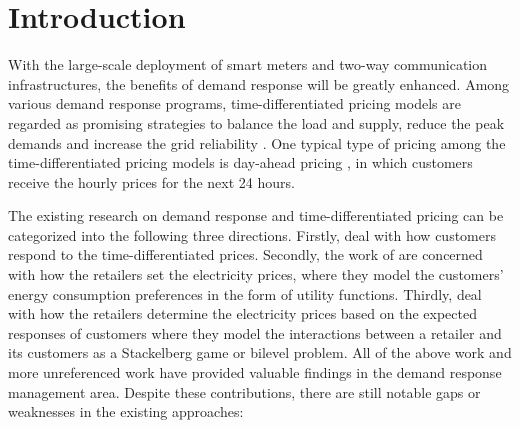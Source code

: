 \documentclass[10pt,journal]{IEEEtran}
\theoremstyle{definition}
\theoremstyle{plain} \newtheorem{theo}{Theorem} \newtheorem{prop}{Proposition}  \newtheorem{lemm}{Lemma}
\begin{document}
\IEEEpeerreviewmaketitle




\section{Introduction}



With the large-scale deployment of smart meters and two-way communication infrastructures, the benefits of demand response will be greatly enhanced. Among various demand response programs, time-differentiated pricing models are regarded as promising strategies to balance the load and supply, reduce the peak demands and increase the grid reliability \cite{palensky2011demand}. One typical type of pricing among the time-differentiated pricing models is day-ahead pricing \cite{siano2014demand}, in which customers receive the hourly prices for the next 24 hours.





The existing research on demand response and time-differentiated pricing can be categorized into the following three directions. Firstly, \cite{Leon-garcia2010,Mohsenian-Rad2010,adika2013autonomous,liu2014peak} deal with how customers respond to the time-differentiated prices. Secondly, the work of \cite{Samadi2010,Li2011,yang2012game} are concerned with how the retailers set the electricity prices, where they model the customers' energy consumption preferences in the form of  utility functions. Thirdly, \cite{Yu2011,chen2011innovative,chen2012optimal,qian2013demand,maharjan2013dependable,zugno2013bilevel,chai2014demand}
deal with how the retailers determine the electricity prices based on the expected responses of customers where they model the interactions between a retailer and its customers as a Stackelberg game or bilevel problem. All of the above work and more unreferenced work have provided valuable findings in the demand response management area. Despite these contributions, there are still notable gaps or weaknesses in the existing approaches:
\end{document}
